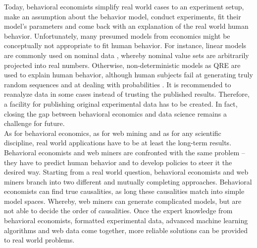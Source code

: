\documentclass[conference]{IEEEtran}
\begin{document}
\indent Today, behavioral economists simplify real world cases to an experiment setup, make an assumption about the behavior model, conduct experiments, fit their model's parameters and come back with an explanation of the real world human behavior. Unfortunately, many presumed models from economics might be conceptually not appropriate to fit human behavior. For instance, linear models are commonly used on nominal data \cite{experimental, sefton}, whereby nominal value sets are arbitrarily projected into real numbers. Otherwise, non-deterministic models as QRE \cite{qre} are used to explain human behavior, although human subjects fail at generating truly random sequences and at dealing with probabilities \cite{wagenaar, nonlogic}. It is recommended to reanalyze data in some cases instead of trusting the published results. Therefore, a facility for publishing original experimental data has to be created. In fact, closing the gap between behavioral economics and data science remains a challenge for future.\\
\indent As for behavioral economics, as for web mining and as for any scientific discipline, real world applications have to be at least the long-term results. Behavioral economists and web miners are confronted with the same problem -- they have to predict human behavior and to develop policies to steer it the desired way. Starting from a real world question, behavioral economists and web miners branch into two different and mutually completing approaches. Behavioral economists can find true causalities, as long these causalities match into simple model spaces. Whereby, web miners can generate complicated models, but are not able to decide the order of causalities. Once the expert knowledge from behavioral economists, formatted experimental data, advanced machine learning algorithms and web data come together, more reliable solutions can be provided to real world problems.\\  
\end{document}
